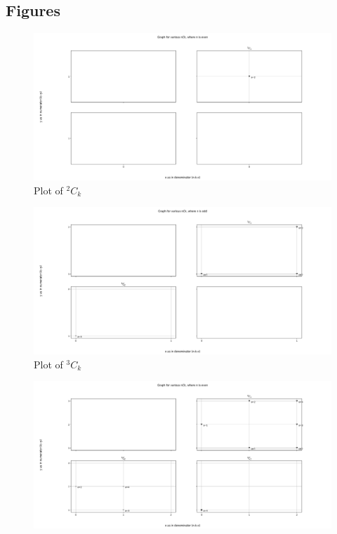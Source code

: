 \documentclass[12pt, twoside]{article}
\newcommand*{\Combination}[2]{{}^{#1}C_{#2}}%
\begin{document}
\begin{appendices}
\section{Figures}
\begin{figure}[ph!]
	\includegraphics[width=\linewidth]{2Ck.png}
	\caption{Plot of $\Combination{2}{k}$}
	\label{2Ck}
\end{figure}
\begin{figure}[ph!]	
	\includegraphics[width=\linewidth]{3Ck.png}
	\caption{Plot of $\Combination{3}{k}$}
	\label{3Ck}
\end{figure}
\begin{figure}[ph!]	
	\includegraphics[width=\linewidth]{4Ck.png}

\end{figure}
\end{appendices}
\end{document}
